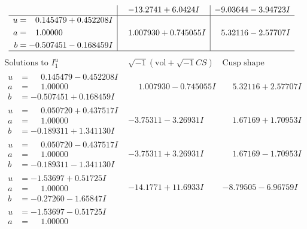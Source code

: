 \documentclass[1p]{elsarticle_modified}
\theoremstyle{definition}
\newcommand{\I}{\sqrt{-1}}
\begin{document}
$$\begin{array}{c|c|c}
 & -13.2741 + 6.0424 I & -9.03644 - 3.94723 I \\ \hline\begin{aligned}
u &= \phantom{-}0.145479 + 0.452208 I \\
a &= \phantom{-}1.00000\phantom{ +0.000000I} \\
b &= -0.507451 - 0.168459 I\end{aligned}
 & \phantom{-}1.007930 + 0.745055 I & \phantom{-}5.32116 - 2.57707 I\\
 \hline 
 \end{array}$$\newpage$$\begin{array}{c|c|c}  
\text{Solutions to }I^u_{1}& \I (\text{vol} + \sqrt{-1}CS) & \text{Cusp shape}\\
 \hline 
\begin{aligned}
u &= \phantom{-}0.145479 - 0.452208 I \\
a &= \phantom{-}1.00000\phantom{ +0.000000I} \\
b &= -0.507451 + 0.168459 I\end{aligned}
 & \phantom{-}1.007930 - 0.745055 I & \phantom{-}5.32116 + 2.57707 I \\ \hline\begin{aligned}
u &= \phantom{-}0.050720 + 0.437517 I \\
a &= \phantom{-}1.00000\phantom{ +0.000000I} \\
b &= -0.189311 + 1.341130 I\end{aligned}
 & -3.75311 - 3.26931 I & \phantom{-}1.67169 + 1.70953 I \\ \hline\begin{aligned}
u &= \phantom{-}0.050720 - 0.437517 I \\
a &= \phantom{-}1.00000\phantom{ +0.000000I} \\
b &= -0.189311 - 1.341130 I\end{aligned}
 & -3.75311 + 3.26931 I & \phantom{-}1.67169 - 1.70953 I \\ \hline\begin{aligned}
u &= -1.53697 + 0.51725 I \\
a &= \phantom{-}1.00000\phantom{ +0.000000I} \\
b &= -0.27260 - 1.65847 I\end{aligned}
 & -14.1771 + 11.6933 I & -8.79505 - 6.96759 I \\ \hline\begin{aligned}
u &= -1.53697 - 0.51725 I \\
a &= \phantom{-}1.00000\phantom{ +0.000000I} \\

\end{aligned}
\end{array}$$
\end{document}
